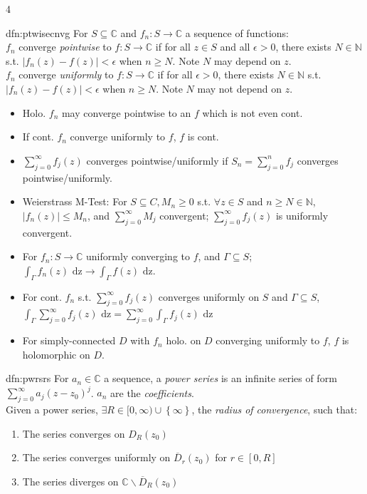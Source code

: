 \documentclass[landscape, 8pt]{extarticle}
\begin{document}
\begin{multicols*}{4}
		
		\begin{dfn}{dfn:ptwisecnvg}{ }
			For $S \subseteq \mathbb{C}$ and $f_n : S \to \mathbb{C}$ a sequence of functions:\\
				$f_n$ converge \textit{pointwise} to $f: S \to \mathbb{C}$ if for all $z \in S$ and all $\epsilon > 0$, there exists $N \in \mathbb{N}$ s.t. $\left|f_n(z) - f(z) \right| <\epsilon$ when $n \ge N$. Note $N$ may depend on $z$.\\
				$f_n$ converge \textit{uniformly} to $f: S \to \mathbb{C}$ if for all $\epsilon > 0$, there exists $N \in \mathbb{N}$ s.t. $\left|f_n(z) - f(z) \right| <\epsilon$ when $n \ge N$. Note $N$ may not depend on $z$.
				\begin{itemize}
				\item Holo. $f_n$ may converge pointwise to an $f$ which is not even cont.
				\item If cont. $f_n$ converge uniformly to $f$, $f$ is cont.
				\item $\sum_{j=0}^{\infty}f_j(z)$ converges pointwise/uniformly if $S_n = \sum_{j=0}^{n}f_j$ converges pointwise/uniformly.
				\item Weierstrass M-Test: For $S \subseteq C, M_n \ge 0$ s.t. $\forall z \in S$ and $n \ge N \in \mathbb{N}$, $\left|f_n(z)\right| \le M_n$, and $\sum_{j=0}^{\infty}M_j$ convergent; $\sum_{j=0}^{\infty}f_j(z)$ is uniformly convergent.
				\item For $f_n : S \to \mathbb{C}$ uniformly converging to $f$, and $\Gamma \subseteq S$; $\int_{\Gamma}f_n(z) \text{ dz} \to \int_{\Gamma}f(z) \text{ dz}$.
				\item For cont. $f_n$ s.t. $\sum_{j=0}^{\infty}f_j(z)$ converges uniformly on $S$ and $\Gamma \subseteq S$, $\int_{\Gamma}\sum_{j=0}^{\infty}f_j(z) \text{ dz} = \sum_{j=0}^{\infty}\int_{\Gamma}f_j(z) \text{ dz}$ 
				\item For simply-connected $D$ with $f_n$ holo. on $D$ converging uniformly to $f$, $f$ is holomorphic on $D$.
				
			\end{itemize}
			
			
		\end{dfn}
		
		
		\begin{dfn}{dfn:pwrsrs}{ }
			For $a_n \in \mathbb{C}$ a sequence, a \textit{power series} is an infinite series of form $\sum_{j=0}^{\infty}a_j (z-z_0)^j$. $a_n$ are the \textit{coefficients}.\\
			Given a power series, $\exists R \in [0, \infty) \cup \left\{\infty\right\}$, the \textit{radius of convergence}, such that:
			\begin{enumerate}[label=(\roman*)]
				\item The series converges on $D_R(z_0)$
				\item The series converges uniformly on $\overline{D}_r(z_0)$ for $r \in [0, R]$
				\item The series diverges on $\mathbb{C} \backslash \overline{D}_R(z_0)$
			\end{enumerate}
			

\end{dfn}
\end{multicols*}
\end{document}
